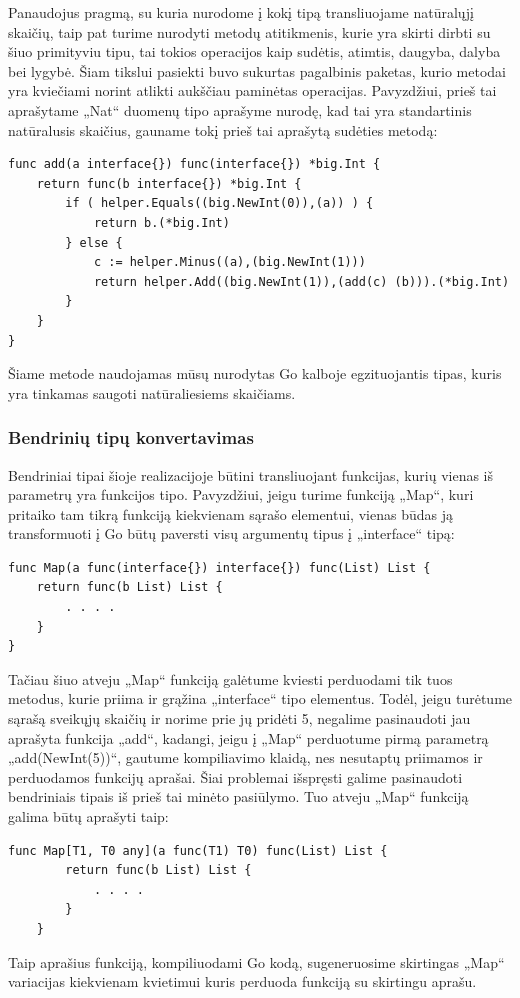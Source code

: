 \documentclass{VUMIFPSkursinis}
\begin{document}
\par Panaudojus pragmą, su kuria nurodome į kokį tipą transliuojame natūralųjį skaičių, taip pat turime nurodyti metodų atitikmenis, kurie yra skirti dirbti su šiuo primityviu tipu, tai tokios operacijos kaip sudėtis, atimtis, daugyba, dalyba bei lygybė. Šiam tikslui pasiekti buvo sukurtas pagalbinis paketas, kurio metodai yra kviečiami norint atlikti aukščiau paminėtas operacijas. Pavyzdžiui, prieš tai aprašytame „Nat“ duomenų tipo aprašyme nurodę, kad tai yra standartinis natūralusis skaičius, gauname tokį prieš tai aprašytą sudėties metodą:
\begin{lstlisting}[language=GoCust]
func add(a interface{}) func(interface{}) *big.Int {
	return func(b interface{}) *big.Int {
 		if ( helper.Equals((big.NewInt(0)),(a)) ) {
 			return b.(*big.Int) 
		} else {
 			c := helper.Minus((a),(big.NewInt(1))) 
 			return helper.Add((big.NewInt(1)),(add(c) (b))).(*big.Int) 
		}
 	}
}
\end{lstlisting}
Šiame metode naudojamas mūsų nurodytas Go kalboje egzituojantis tipas, kuris yra tinkamas saugoti natūraliesiems skaičiams.
\subsubsection{Bendrinių tipų konvertavimas}
Bendriniai tipai šioje realizacijoje būtini transliuojant funkcijas, kurių vienas iš parametrų yra funkcijos tipo. Pavyzdžiui, jeigu turime funkciją „Map“, kuri pritaiko tam tikrą funkciją kiekvienam sąrašo elementui, vienas būdas ją transformuoti į Go būtų paversti visų argumentų tipus į „interface{}“ tipą:
\begin{lstlisting}[language=GoCust]
func Map(a func(interface{}) interface{}) func(List) List {
	return func(b List) List {
		. . . .
	}
}
\end{lstlisting}
Tačiau šiuo atveju „Map“ funkciją galėtume kviesti perduodami tik tuos metodus, kurie priima ir grąžina „interface{}“ tipo elementus. Todėl, jeigu turėtume sąrašą sveikųjų skaičių ir norime prie jų pridėti 5, negalime pasinaudoti jau aprašyta funkcija „add“, kadangi, jeigu į „Map“ perduotume pirmą parametrą „add(NewInt(5))“, gautume kompiliavimo klaidą, nes nesutaptų priimamos ir perduodamos funkcijų aprašai. Šiai problemai išspręsti galime pasinaudoti bendriniais tipais iš prieš tai minėto pasiūlymo. Tuo atveju „Map“ funkciją galima būtų aprašyti taip:
\begin{lstlisting}[language=GoCust]
	func Map[T1, T0 any](a func(T1) T0) func(List) List {
		return func(b List) List {
			. . . .
		}
	}
	\end{lstlisting}
Taip aprašius funkciją, kompiliuodami Go kodą, sugeneruosime skirtingas „Map“ variacijas kiekvienam kvietimui kuris perduoda funkciją su skirtingu aprašu.
\end{document}
